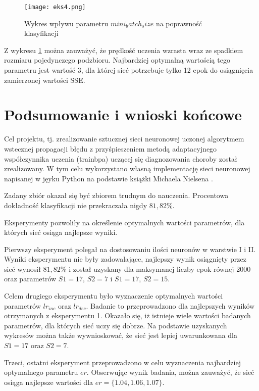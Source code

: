 \documentclass[12pt,twoside]{article}
\begin{document}
\begin{figure}[H]
	\centering
	\texttt{[image: eks4.png]}
	\caption{Wykres wpływu parametru $mini_batch_size$ na poprawność klasyfikacji}
	\label{ryseks4}
\end{figure}

Z wykresu \ref{ryseks4} można zauważyć, że prędkość uczenia wzrasta wraz ze spadkiem rozmiaru pojedynczego podzbioru. Najbardziej optymalną wartością tego parametru jest wartość 3, dla której sieć potrzebuje tylko 12 epok do osiągnięcia zamierzonej wartości SSE. 


\clearpage
\section{Podsumowanie i wnioski końcowe}

Cel projektu, tj. zrealizowanie sztucznej sieci neuronowej uczonej algorytmem wstecznej propagacji błędu z przyśpieszeniem metodą adaptacyjnego współczynnika uczenia (trainbpa) uczącej się diagnozowania choroby został zrealizowany. W tym celu wykorzystano własną implementację sieci neuronowej napisanej w jęyku Python na podstawie książki Michaela Nielsena \cite{nielsen}. 

Zadany zbiór okazał się być zbiorem trudnym do nauczenia. Procentowa dokładność klasyfikacji nie przekraczała nigdy $81,82\%$. 

Eksperymenty pozwoliły na określenie optymalnych wartości parametrów, dla których sieć osiąga najlepsze wyniki. 

Pierwszy eksperyment polegał na dostosowaniu ilości neuronów w warstwie I i II. Wyniki eksperymentu nie były zadowalające, najlepszy wynik osiągnięty przez sieć wynosił $81,82\%$ i został uzyskany dla maksymanej liczby epok równej 2000 oraz parametrów $S1=17$, $S2=7$ i $S1=17$, $S2=15$. 

Celem drugiego eksperymentu było wyznaczenie optymalnych wartości parametrów $lr_{inc}$ oraz $lr_{dec}$. Badanie to przeprowadzono dla najlepszych wyników otrzymanych z eksperymentu 1. Okazało się, iż istnieje wiele wartości badanych parametrów, dla których sieć uczy się dobrze. Na podstawie uzyskanych wykresów można także wywnioskować, że sieć jest lepiej uwarunkowana dla $S1 = 17$ oraz $S2 = 7$.

Trzeci, ostatni eksperyment przeprowadzono w celu wyznaczenia najbardziej optymalnego parametru $er$. Obserwując wynik badania, można zauważyć, że sieć osiąga najlepsze wartości dla $er = \{1.04, 1.06, 1.07\}$. 
\end{document}

